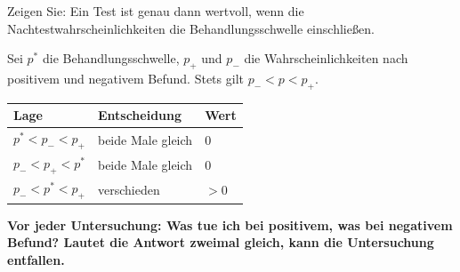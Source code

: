 \begin{aufgabe}
Zeigen Sie: Ein Test ist genau dann wertvoll, wenn die Nachtestwahrscheinlichkeiten die Behandlungsschwelle einschließen.

\loesung
{}
Sei $p^{*}$ die Behandlungsschwelle, $p_{+}$ und $p_{-}$ die Wahrscheinlichkeiten nach positivem und negativem Befund. Stets gilt $p_{-} < p < p_{+}$.

\begin{center}
{\small
\renewcommand{\arraystretch}{1.5}
\begin{tabular}{@{}P{3.0cm}P{3.0cm}P{2.2cm}@{}}
\toprule
\textbf{Lage} & \textbf{Entscheidung} & \textbf{Wert}\\
\midrule
$p^{*} < p_{-} < p_{+}$ & beide Male gleich & $0$\\
$p_{-} < p_{+} < p^{*}$ & beide Male gleich & $0$\\
$p_{-} < p^{*} < p_{+}$ & verschieden & $> 0$\\
\bottomrule
\end{tabular}}
\end{center}

\begin{center}
\begin{minipage}{0.88\textwidth}
\end{minipage}
\end{center}

\begin{center}
\begin{minipage}{0.9\textwidth}
\textbf{Vor jeder Untersuchung: Was tue ich bei positivem, was bei negativem Befund? Lautet die Antwort zweimal gleich, kann die Untersuchung entfallen.}
\end{minipage}
\end{center}

\begin{center}
\begin{minipage}{0.88\textwidth}
\end{minipage}
\end{center}
\end{aufgabe}

